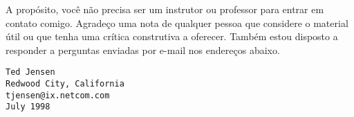 A propósito, você não precisa ser um instrutor ou professor para entrar em contato comigo. Agradeço uma nota de qualquer pessoa que considere o material útil ou que tenha uma crítica construtiva a oferecer. Também estou disposto a responder a perguntas enviadas por e-mail nos endereços abaixo.

\begin{verbatim}
Ted Jensen
Redwood City, California
tjensen@ix.netcom.com
July 1998
\end{verbatim}
